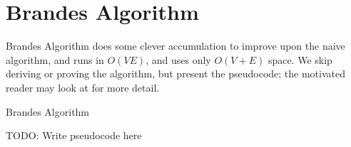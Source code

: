 \section{Brandes Algorithm}
Brandes Algorithm does some clever accumulation to improve upon the naive
algorithm, and runs in $O(VE)$, and uses only $O(V + E)$ space.
We skip deriving or proving the algorithm, but present the pseudocode;
the motivated reader may look at \cite{brandes01} for more detail.

\begin{algorithm}
\caption{Brandes Algorithm}
\label{brandes}
\begin{algorithmic}
	\State TODO: Write pseudocode here
\end{algorithmic}
\end{algorithm}
